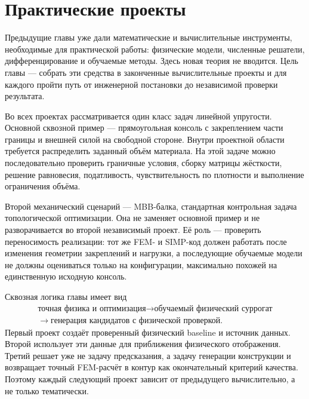 
\chapter{Практические проекты}
\label{chap:practical-projects}

Предыдущие главы уже дали математические и вычислительные инструменты, необходимые для практической работы: физические модели, численные решатели, дифференцирование и обучаемые методы. Здесь новая теория не вводится. Цель главы --- собрать эти средства в законченные вычислительные проекты и для каждого пройти путь от инженерной постановки до независимой проверки результата.

Во всех проектах рассматривается один класс задач линейной упругости. Основной сквозной пример --- прямоугольная консоль с закреплением части границы и внешней силой на свободной стороне. Внутри проектной области требуется распределить заданный объём материала. На этой задаче можно последовательно проверить граничные условия, сборку матрицы жёсткости, решение равновесия, податливость, чувствительность по плотности и выполнение ограничения объёма.

Второй механический сценарий --- MBB-балка, стандартная контрольная задача топологической оптимизации. Она не заменяет основной пример и не разворачивается во второй независимый проект. Её роль --- проверить переносимость реализации: тот же FEM- и SIMP-код должен работать после изменения геометрии закреплений и нагрузки, а последующие обучаемые модели не должны оцениваться только на конфигурации, максимально похожей на единственную исходную консоль.

Сквозная логика главы имеет вид
\begin{equation}
\label{eq:practical-projects-pipeline}
 \begin{gathered}
  \text{точная физика и оптимизация}
  \longrightarrow
  \text{обучаемый физический суррогат}
  \\
  \longrightarrow
  \text{генерация кандидатов с физической проверкой}.
 \end{gathered}
\end{equation}
Первый проект создаёт проверенный физический baseline и источник данных. Второй использует эти данные для приближения физического отображения. Третий решает уже не задачу предсказания, а задачу генерации конструкции и возвращает точный FEM-расчёт в контур как окончательный критерий качества. Поэтому каждый следующий проект зависит от предыдущего вычислительно, а не только тематически.

